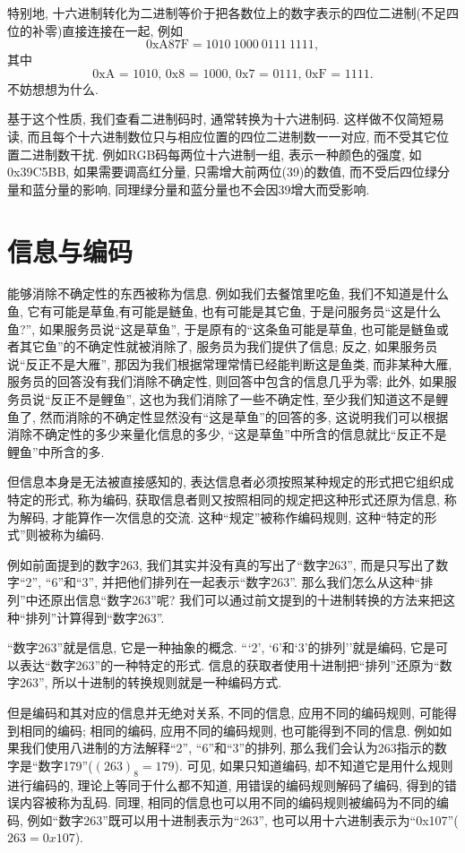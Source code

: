         特别地, 十六进制转化为二进制等价于把各数位上的数字表示的四位二进制(不足四位的补零)直接连接在一起, 例如 
            \[ \textrm{0xA87F} = 1010 \ 1000 \ 0111 \ 1111, \] 
        其中 
            \[ \textrm{0xA = 1010, 0x8 = 1000, 0x7 = 0111, 0xF = 1111}. \]
        不妨想想为什么.

        基于这个性质, 我们查看二进制码时, 通常转换为十六进制码. 这样做不仅简短易读, 而且每个十六进制数位只与相应位置的四位二进制数一一对应, 而不受其它位置二进制数干扰. 例如RGB码每两位十六进制一组, 表示一种颜色的强度, 如0x39C5BB, 如果需要调高红分量, 只需增大前两位(39)的数值, 而不受后四位绿分量和蓝分量的影响, 同理绿分量和蓝分量也不会因39增大而受影响.

    \section{信息与编码}
        能够消除不确定性的东西被称为信息. 例如我们去餐馆里吃鱼, 我们不知道是什么鱼, 它有可能是草鱼,有可能是鲢鱼, 也有可能是其它鱼, 于是问服务员``这是什么鱼?'', 如果服务员说``这是草鱼'', 于是原有的``这条鱼可能是草鱼, 也可能是鲢鱼或者其它鱼''的不确定性就被消除了, 服务员为我们提供了信息; 反之, 如果服务员说``反正不是大雁'', 那因为我们根据常理常情已经能判断这是鱼类, 而非某种大雁, 服务员的回答没有我们消除不确定性, 则回答中包含的信息几乎为零; 此外, 如果服务员说``反正不是鲤鱼'', 这也为我们消除了一些不确定性, 至少我们知道这不是鲤鱼了, 然而消除的不确定性显然没有``这是草鱼''的回答的多, 这说明我们可以根据消除不确定性的多少来量化信息的多少, ``这是草鱼''中所含的信息就比``反正不是鲤鱼''中所含的多. 
        
        但信息本身是无法被直接感知的, 表达信息者必须按照某种规定的形式把它组织成特定的形式, 称为编码, 获取信息者则又按照相同的规定把这种形式还原为信息, 称为解码, 才能算作一次信息的交流. 这种``规定''被称作编码规则, 这种``特定的形式''则被称为编码.

        例如前面提到的数字263, 我们其实并没有真的写出了``数字263'', 而是只写出了数字``2'', ``6''和``3'', 并把他们排列在一起表示``数字263''. 那么我们怎么从这种``排列''中还原出信息``数字263''呢? 我们可以通过前文提到的十进制转换的方法来把这种``排列''计算得到``数字263''. 

        ``数字263''就是信息, 它是一种抽象的概念. ```2', `6'和`3'的排列''就是编码, 它是可以表达``数字263''的一种特定的形式. 信息的获取者使用十进制把``排列''还原为``数字263'', 所以十进制的转换规则就是一种编码方式.

        但是编码和其对应的信息并无绝对关系, 不同的信息, 应用不同的编码规则, 可能得到相同的编码; 相同的编码, 应用不同的编码规则, 也可能得到不同的信息. 例如如果我们使用八进制的方法解释``2'', ``6''和``3''的排列, 那么我们会认为263指示的数字是``数字179''($ (263)_8 = 179 $). 可见, 如果只知道编码, 却不知道它是用什么规则进行编码的, 理论上等同于什么都不知道, 用错误的编码规则解码了编码, 得到的错误内容被称为乱码. 同理, 相同的信息也可以用不同的编码规则被编码为不同的编码, 例如``数字263''既可以用十进制表示为``263'', 也可以用十六进制表示为``0x107''($ 263 = 0x107 $).

